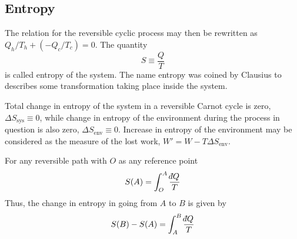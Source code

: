 \documentclass[../../../Main.tex]{subfiles}
\begin{document}
\subsection*{Entropy}
The relation for the reversible cyclic process may then be rewritten as $Q_h /T_h + (-Q_c /T_c ) = 0$. The quantity
\begin{equation*}
    S\equiv \frac{Q}{T}
\end{equation*}
is called entropy of the system. The name entropy was coined by Clausius to describes some transformation taking place inside the system.  

Total change in entropy of the system in a reversible Carnot cycle is zero, $\Delta S_{\text{sys}}\equiv0$, while change in entropy of the environment during the process in question is also zero, $\Delta S_{\text{env}}\equiv 0$. Increase in entropy of the environment may be considered as the measure of the lost work, $W'=W-T\Delta S_{\text{env}}$.

For any reversible path with $O$ as any reference point 
\begin{equation*}
    S(A)=\int_O^A\frac{\dbar Q}{T}
\end{equation*}
Thus, the change in entropy in going from $A$ to $B$ is given by
\begin{equation*}
    S(B)-S(A)=\int_A^B\frac{\dbar Q}{T}
\end{equation*}
\end{document}
